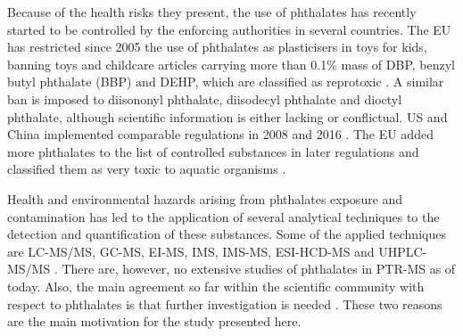 %

Because of the health risks they present, the use of phthalates has recently started to be controlled by the enforcing authorities in several countries. The EU has restricted since 2005 the use of phthalates as plasticisers in toys for kids, banning toys and childcare articles carrying more than  0.1\% mass of DBP, %
benzyl butyl phthalate (BBP)  and DEHP, which are classified as reprotoxic  
\cite{Parliament2005}. 
A similar ban is imposed to diisononyl phthalate, diisodecyl phthalate and dioctyl phthalate, although scientific information is either lacking or conflictual.
US and China  implemented comparable regulations in 2008  and 2016 \cite{USban,chinaGB6675}.
%
The EU added more phthalates to the list of controlled substances in later regulations and classified them as very toxic to aquatic organisms \cite{Parliament2008}.


%
%
Health and environmental hazards arising from phthalates exposure and contamination has led to the application of several analytical techniques to the detection and quantification  of these substances.
%
Some of the applied techniques are
LC-MS/MS, %
GC-MS,  %
EI-MS, %
IMS, IMS-MS, %
ESI-HCD-MS %
and
UHPLC-MS/MS %
 \cite{xu2014determination,net2015reliable,GC-PICI-phthalates,lacko2018dissociation,mzcloudd,michalczuk2019isomer,fan2012determination}.
%
%
%
%
%
There are, however, no extensive studies of phthalates in PTR-MS as of today.
%
Also, the main agreement so far within the scientific community with respect to phthalates is that further investigation is needed \cite{hauser2005phthalates}.
%
These two reasons are the main motivation for the study presented here. 


